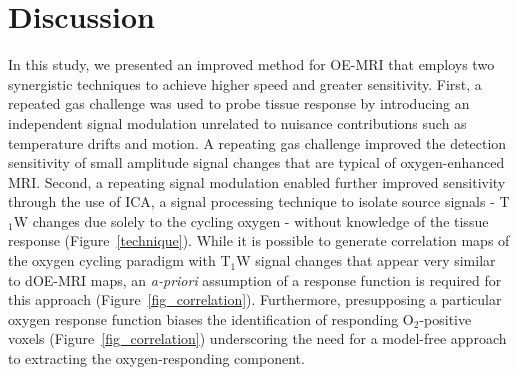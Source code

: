 
\section{Discussion}

In this study, we presented an improved method for OE-MRI that employs two synergistic techniques to achieve higher speed and greater sensitivity.
First, a repeated gas challenge was used to probe tissue response by introducing an independent signal modulation unrelated to nuisance contributions such as temperature drifts and motion.
A repeating gas challenge improved the detection sensitivity of small amplitude signal changes that are typical of oxygen-enhanced MRI.
Second, a repeating signal modulation enabled further improved sensitivity through the use of \ac{ICA}, a signal processing technique to isolate source signals - T$_1$W changes due solely to the cycling oxygen - without knowledge of the tissue response (Figure~\ref{technique}).
While it is possible to generate correlation maps of the oxygen cycling paradigm with T$_1$W signal changes that appear very similar to \ac{dOE-MRI} maps, an \emph{a-priori} assumption of a response function is required for this approach (Figure~\ref{fig_correlation}).
Furthermore, presupposing a particular oxygen response function biases the identification of responding O$_2$-positive voxels (Figure~\ref{fig_correlation}) underscoring the need for a model-free approach to extracting the oxygen-responding component.

